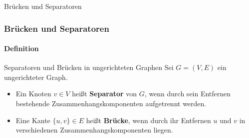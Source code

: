 \begin{frame}
	\Huge Brücken und Separatoren
\end{frame}

\begin{frame}
	\frametitle{Brücken und Separatoren}
	\framesubtitle{Definition}
	\begin{KITinfoblock}{Separatoren und Brücken in ungerichteten Graphen}
		Sei $G = (V,E)$ ein ungerichteter Graph.
	\begin{itemize}
		\item  Ein Knoten $v \in V$ heißt \textbf{Separator} von $G$, wenn  durch sein Entfernen bestehende Zusammenhangskomponenten aufgetrennt werden.
		\item  Eine Kante $\{u,v\} \in E$ heißt \textbf{Brücke}, wenn durch ihr Entfernen  $u$ und $v$ in verschiedenen Zusammenhangskomponenten liegen.
	\end{itemize}
	\end{KITinfoblock}
	
\end{frame}

